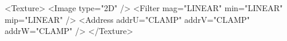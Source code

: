 <Texture>
    <Image type="2D" />
    <Filter mag="LINEAR" min="LINEAR" mip="LINEAR" />
    <Address addrU="CLAMP" addrV="CLAMP" addrW="CLAMP" />
</Texture>

